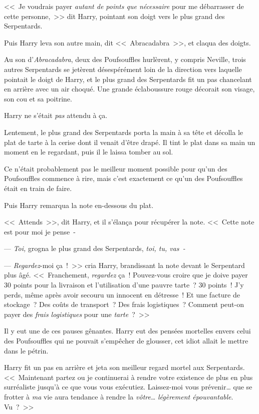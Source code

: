 <<~Je voudrais payer \emph{autant de points que nécessaire} pour me débarrasser de cette personne,~>> dit Harry, pointant son doigt vers le plus grand des Serpentards.

Puis Harry leva son autre main, dit <<~Abracadabra~>>, et claqua des doigts.

Au son d'\emph{Abracadabra}, deux des Poufsouffles hurlèrent, y compris Neville, trois autres Serpentards se jetèrent désespérément loin de la direction vers laquelle pointait le doigt de Harry, et le plus grand des Serpentards fit un pas chancelant en arrière avec un air choqué. Une grande éclaboussure rouge décorait son visage, son cou et sa poitrine.

Harry ne s'était \emph{pas} attendu à ça.

Lentement, le plus grand des Serpentards porta la main à sa tête et décolla le plat de tarte à la cerise dont il venait d'être drapé. Il tint le plat dans sa main un moment en le regardant, puis il le laissa tomber au sol.

Ce n'était probablement pas le meilleur moment possible pour qu'un des Poufsouffles commence à rire, mais c'est exactement ce qu'un des Poufsouffles était en train de faire.

Puis Harry remarqua la note en-dessous du plat.

<<~Attends~>>, dit Harry, et il s'élança pour récupérer la note. <<~Cette note est pour moi je pense~-

--- \emph{Toi,} grogna le plus grand des Serpentards, \emph{toi, tu, vas~-}

--- \emph{Regardez}-moi ça~!~>> cria Harry, brandissant la note devant le Serpentard plus âgé. <<~Franchement, \emph{regardez} ça~! Pouvez-vous croire que je doive payer 30 points pour la livraison et l'utilisation d'une pauvre tarte~? 30 points~! J'y perds, même après avoir secouru un innocent en détresse~! Et une facture de stockage~? Des coûts de transport~? Des frais logistiques~? Comment peut-on payer des \emph{frais logistiques} pour une \emph{tarte}~?~>>

Il y eut une de ces pauses gênantes. Harry eut des pensées mortelles envers celui des Poufsouffles qui ne pouvait s'empêcher de glousser, cet idiot allait le mettre dans le pétrin.

Harry fit un pas en arrière et jeta son meilleur regard mortel aux Serpentards. <<~Maintenant partez ou je continuerai à rendre votre existence de plus en plus surréaliste jusqu'à ce que vous vous exécutiez. Laissez-moi vous prévenir… que se frotter à \emph{ma} vie aura tendance à rendre la \emph{vôtre}… \emph{légèrement épouvantable}. Vu~?~>>

